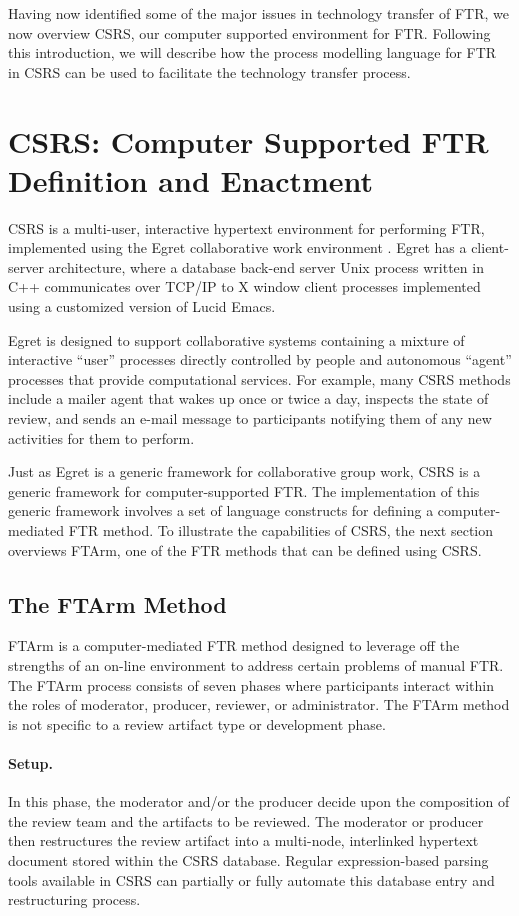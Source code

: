 Having now identified some of the major issues in technology transfer of
FTR, we now overview CSRS, our computer supported environment for FTR.
Following this introduction, we will describe how the process modelling
language for FTR in CSRS can be used to facilitate the technology transfer
process. 

\section{CSRS: Computer Supported FTR Definition and Enactment}
\label{sec:csrs}

CSRS is a multi-user, interactive hypertext environment for performing FTR,
implemented using the Egret collaborative work environment
\cite{csdl-92-01}.  Egret has a client-server architecture, where a
database back-end server Unix process written in C++ communicates over
TCP/IP to X window client processes implemented using a customized version
of Lucid Emacs.

Egret is designed to support collaborative systems containing a mixture of
interactive ``user'' processes directly controlled by people and autonomous
``agent'' processes that provide computational services.  For example, many
CSRS methods include a mailer agent that wakes up once or twice a day,
inspects the state of review, and sends an e-mail message to participants
notifying them of any new activities for them to perform.

Just as Egret is a generic framework for collaborative group work, CSRS is
a generic framework for computer-supported FTR.  The implementation of this
generic framework involves a set of language constructs for defining a
computer-mediated FTR method.  To illustrate the capabilities of CSRS, the
next section overviews FTArm, one of the FTR methods that can be defined
using CSRS.

\subsection{The FTArm Method}

FTArm is a computer-mediated FTR method designed to leverage off the
strengths of an on-line environment to address certain problems of manual
FTR.  The FTArm process consists of seven phases where participants
interact within the roles of moderator, producer, reviewer, or
administrator.  The FTArm method is not specific to a review artifact type
or development phase.

\paragraph{Setup.} In this phase, the moderator and/or the producer
decide upon the composition of the review team and the artifacts to be
reviewed. The moderator or producer then restructures the review artifact
into a multi-node, interlinked hypertext document stored within the CSRS
database.  Regular expression-based parsing tools available in CSRS can
partially or fully automate this database entry and restructuring process.


